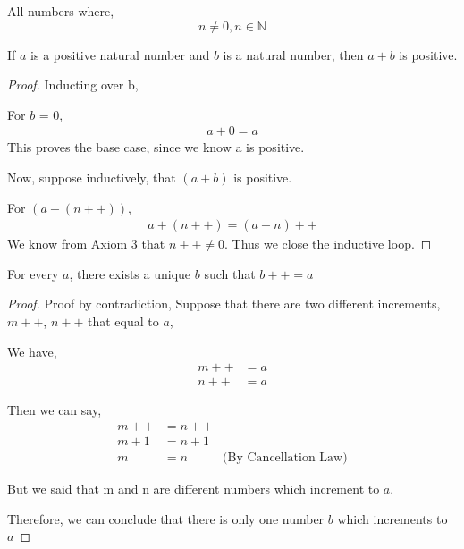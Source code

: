 \documentclass[11pt]{report}
\begin{document}
\begin{definition}
	All numbers where,
	\[
		n \neq 0, n \in \mathbb{N}
	\]
\end{definition}
\begin{prop}
	If $a$ is a positive natural number and $b$ is a natural number, then $a+b$ is positive.
\end{prop}
\begin{proof}
	Inducting over b,

	For $b$ = 0,
	\begin{align*}
		a+0 = a
	\end{align*}
	This proves the base case, since we know a is positive.

	Now, suppose inductively, that $(a+b)$ is positive.

	For $(a+(n++))$,
	\begin{align*}
		a+(n++) = (a+n)++
	\end{align*}
	We know from Axiom 3 that $n++ \neq 0$. Thus we close the inductive loop.
\end{proof}
\begin{lemma}
	For every $a$, there exists a unique $b$ such that $b++ = a$
\end{lemma}
\begin{proof}
	Proof by contradiction,
	Suppose that there are two different increments, $m++$, $n++$ that equal to $a$,

	We have,
	\begin{align*}
		m++ & = a \\
		n++ & = a
	\end{align*}

	Then we can say,
	\begin{align*}
		m++   & = n++                                \\
		m + 1 & = n+1                                \\
		m     & = n   & \text{(By Cancellation Law)}
	\end{align*}

	But we said that m and n are different numbers which increment to $a$.

	Therefore, we can conclude that there is only one number $b$ which increments to $a$
\end{proof}
\end{document}
